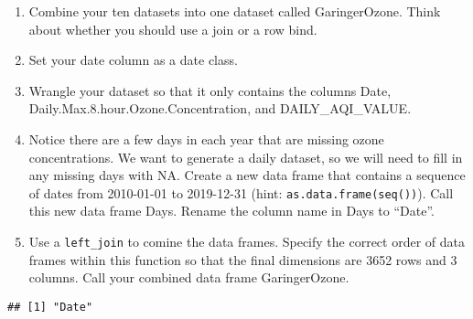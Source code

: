 \documentclass[]{article}
\newenvironment{Shaded}{\begin{snugshade}}{\end{snugshade}}
\newcommand{\CommentTok}[1]{\textcolor[rgb]{0.56,0.35,0.01}{\textit{#1}}}
\newcommand{\DataTypeTok}[1]{\textcolor[rgb]{0.13,0.29,0.53}{#1}}
\newcommand{\KeywordTok}[1]{\textcolor[rgb]{0.13,0.29,0.53}{\textbf{#1}}}
\newcommand{\NormalTok}[1]{#1}
\newcommand{\OperatorTok}[1]{\textcolor[rgb]{0.81,0.36,0.00}{\textbf{#1}}}
\newcommand{\StringTok}[1]{\textcolor[rgb]{0.31,0.60,0.02}{#1}}
\begin{document}
\begin{enumerate}
\def\labelenumi{\arabic{enumi}.}
\setcounter{enumi}{1}
\item
  Combine your ten datasets into one dataset called GaringerOzone. Think
  about whether you should use a join or a row bind.
\item
  Set your date column as a date class.
\item
  Wrangle your dataset so that it only contains the columns Date,
  Daily.Max.8.hour.Ozone.Concentration, and DAILY\_AQI\_VALUE.
\item
  Notice there are a few days in each year that are missing ozone
  concentrations. We want to generate a daily dataset, so we will need
  to fill in any missing days with NA. Create a new data frame that
  contains a sequence of dates from 2010-01-01 to 2019-12-31 (hint:
  \texttt{as.data.frame(seq())}). Call this new data frame Days. Rename
  the column name in Days to ``Date''.
\item
  Use a \texttt{left\_join} to comine the data frames. Specify the
  correct order of data frames within this function so that the final
  dimensions are 3652 rows and 3 columns. Call your combined data frame
  GaringerOzone.
\end{enumerate}

\begin{Shaded}
\end{Shaded}

\begin{verbatim}
## [1] "Date"
\end{verbatim}
\end{document}
